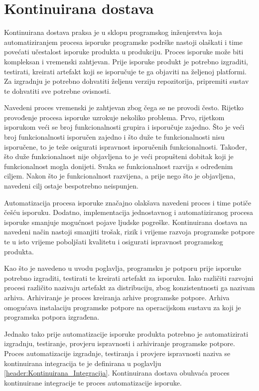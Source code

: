 \documentclass[times, utf8, diplomski, numeric]{fer}
\begin{document}
\chapter{Kontinuirana dostava} \label{header:KontinuiranaDostava}

Kontinuirana dostava praksa je u sklopu programskog inženjerstva koja automatiziranjem procesa isporuke programske podrške nastoji olaškati i time povećati učestalost isporuke produkta u produkciju. Proces isporuke može biti kompleksan i vremenski zahtjevan. Prije isporuke produkt je potrebno izgraditi, testirati, kreirati artefakt koji se isporučuje te ga objaviti na željenoj platformi. Za izgradnju je potrebno dohvatiti željenu verziju repozitorija, pripremiti sustav te dohvatiti sve potrebne ovisnosti.

Navedeni proces vremenski je zahtjevan zbog čega se ne provodi često. Rijetko provođenje procesa isporuke uzrokuje nekoliko problema. Prvo, rijetkom isporukom veći se broj funkcionalnosti grupira i isporučuje zajedno. Što je veći broj funkcionalnosti isporučen zajedno i što duže te funkcionalnosti nisu isporučene, to je teže osigurati ispravnost isporučenih funkcionalnosti. Također, što duže funkcionalnost nije objavljena to je veći propušteni dobitak koji je funkcionalnost mogla donijeti. Svaka se funkcionalnost razvija s određenim ciljem. Nakon što je funkcionalnost razvijena, a prije nego što je objavljena, navedeni cilj ostaje bespotrebno neispunjen.

Automatizacija procesa isporuke značajno olakšava navedeni proces i time potiče češću isporuku. Dodatno, implementacija jednostavnog i automatiziranog procesa isporuke smanjuje mogućnost pojave ljudske pogreške. Kontinuirana dostava na navedeni način nastoji smanjiti trošak, rizik i vrijeme razvoja programske potpore te u isto vrijeme poboljšati kvalitetu i osigurati ispravnost programskog produkta\citep{wiki:ContinuousDelivery}.

Kao što je navedeno u uvodu poglavlja, programsku je potporu prije isporuke potrebno izgraditi, testirati te kreirati artefakt za isporuku. Iako različiti razvojni procesi različito nazivaju artefakt za distribuciju, zbog konzistentnosti ga nazivam arhiva. Arhiviranje je proces kreiranja arhive programske potpore. Arhiva omogućava instalaciju programske potpore na operacijskom sustavu za koji je programska potpora izgrađena.

Jednako tako prije automatizacije isporuke produkta potrebno je automatizirati izgradnju, testiranje, provjeru ispravnosti i arhiviranje programske potpore. Proces automatizacije izgradnje, testiranja i provjere ispravnosti naziva se kontinuirana integracija te je definirana u poglavlju \ref{header:Kontinuirana_Integracija}. Kontinuirana dostava obuhvaća proces kontinuirane integracije te proces automatizacije isporuke.
\end{document}
